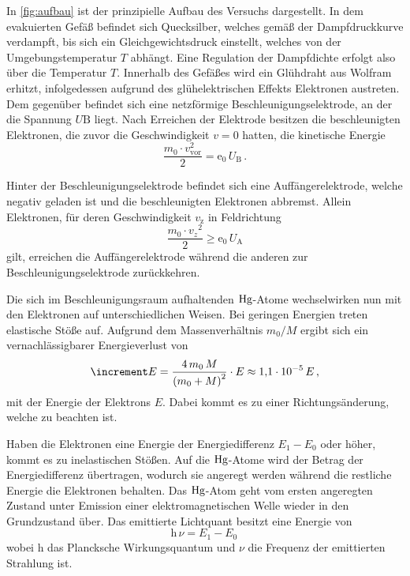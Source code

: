 In \autoref{fig:aufbau} ist der prinzipielle Aufbau des Versuchs dargestellt.
In dem evakuierten Gefäß befindet sich Quecksilber, welches gemäß der Dampfdruckkurve verdampft,
bis sich ein Gleichgewichtsdruck einstellt, welches von der Umgebungstemperatur $T$ abhängt.
Eine Regulation der Dampfdichte erfolgt also über die Temperatur $T$.
Innerhalb des Gefäßes wird ein Glühdraht aus Wolfram erhitzt, 
infolgedessen aufgrund des glühelektrischen Effekts Elektronen austreten.
Dem gegenüber befindet sich eine netzförmige Beschleunigungselektrode, an der die Spannung $U\text{B}$ liegt.
Nach Erreichen der Elektrode besitzen die beschleunigten Elektronen, die zuvor die Geschwindigkeit $v = 0$ hatten, die kinetische Energie
\begin{equation}
    \frac{m_{0} \cdot v_{\mathrm{vor}}^{2}}{2} = \mathrm{e}_{0} \, U_{\mathrm{B}} \, .
\end{equation}

Hinter der Beschleunigungselektrode befindet sich eine Auffängerelektrode, 
welche negativ geladen ist und die beschleunigten Elektronen abbremst.
Allein Elektronen, für deren Geschwindigkeit $v_\text{z}$ in Feldrichtung
\begin{equation}
    \frac{m_{0} \cdot v_{z}{ }^{2}}{2}  \geq \mathrm{e}_{0} \, U_{\mathrm{A}}
\end{equation}
gilt, erreichen die Auffängerelektrode während die anderen zur Beschleunigungselektrode zurückkehren.

Die sich im Beschleunigungsraum aufhaltenden $\ce{Hg}$-Atome wechselwirken nun mit den Elektronen auf unterschiedlichen Weisen.
Bei geringen Energien treten elastische Stöße auf. 
Aufgrund dem Massenverhältnis $m_0/M$ ergibt sich ein vernachlässigbarer Energieverlust von
\begin{equation}
    \increment E=\frac{4 \, m_{0} \, M}{\left(m_{0}+M\right)^{2}} \cdot E \approx \num{1.1e{-5}} \, E \, ,
\end{equation}
mit der Energie der Elektrons $E$. 
Dabei kommt es zu einer Richtungsänderung, welche zu beachten ist.

Haben die Elektronen eine Energie der Energiedifferenz $E_1 - E_0$ oder höher, kommt es zu inelastischen Stößen.
Auf die $\ce{Hg}$-Atome wird der Betrag der Energiedifferenz übertragen, wodurch sie angeregt werden während die restliche Energie die Elektronen behalten. 
Das $\ce{Hg}$-Atom geht vom ersten angeregten Zustand unter Emission einer elektromagnetischen Welle wieder in den Grundzustand über. 
Das emittierte Lichtquant besitzt eine Energie von
\begin{equation}
    \text{h} \, \nu = E_1 - E_0 \, 
\end{equation}
wobei h das Plancksche Wirkungsquantum und $\nu$ die Frequenz der emittierten Strahlung ist.


